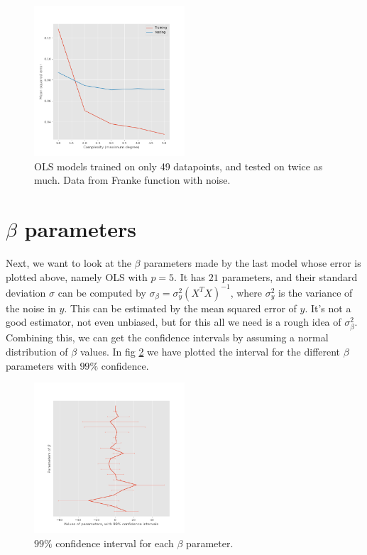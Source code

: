 \documentclass[11pt, a4paper]{report}
\begin{document}
\begin{figure}
\begin{center}
\includegraphics[width=0.5\textwidth]{../plots/overfitting_franke.png}
\end{center}
\caption{OLS models trained on only 49 datapoints, and tested on twice as much. Data from Franke function with noise.}
\label{fig:franke_overfitting}
\end{figure}

\section{$\beta$ parameters}

Next, we want to look at the $\beta$ parameters made by the last model whose error is plotted above, namely OLS with $p = 5$. It has $21$ parameters, and their standard deviation $\sigma$ can be computed by $\sigma_{\beta} = \sigma_y^2 (X^T X)^{-1}$, where $\sigma_y^2$ is the variance of the noise in $y$. This can be estimated by the mean squared error of $y$. It's not a good estimator, not even unbiased, but for this all we need is a rough idea of $\sigma_\beta^2$. Combining this, we can get the confidence intervals by assuming a normal distribution of $\beta$ values. In fig \ref{fig:conf_interval} we have plotted the interval for the different $\beta$ parameters with $99\%$ confidence.

\begin{figure}
\begin{center}
\includegraphics[width=0.5\textwidth]{../plots/conf_interval_beta_franke.png}
\end{center}
\caption{$99\%$ confidence interval for each $\beta$ parameter.}
\label{fig:conf_interval}
\end{figure}
\end{document}
